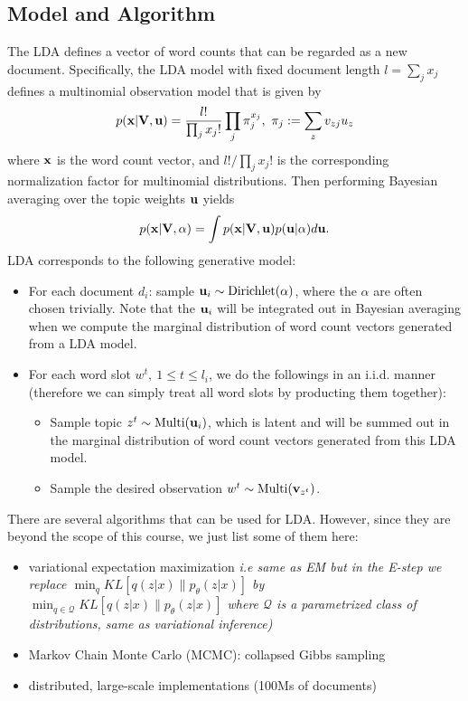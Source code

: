 \documentclass[../book-template.tex]{subfiles}
\begin{document}
\subsection{Model and Algorithm}
The LDA defines a vector of word counts that can be regarded as a new document. Specifically, the LDA model with fixed document length $l=\sum_j x_j$ defines a multinomial observation model that is given by
\begin{equation*}
p({\bf x}|{\bf V, u})=\frac{l!}{\prod_j x_j!}\prod_j \pi_j^{x_j},\ \pi_j := \sum_z v_{zj}u_z
\end{equation*}
where ${\bf x}$ is the word count vector, and $l!/\prod_j x_j!$ is the corresponding normalization factor for multinomial distributions. Then performing Bayesian averaging over the topic weights ${\bf u}$ yields
\begin{equation*}
	p({\bf x}|{\bf V}, \alpha) = \int p({\bf x}|{\bf V, u}) p({\bf u}|\alpha)d{\bf u}.
\end{equation*}
LDA corresponds to the following generative model:
\begin{itemize}
	\item For each document $d_i$: sample ${\bf u}_i\sim \text{Dirichlet}(\alpha)$, where the $\alpha$ are often chosen trivially. Note that the ${\bf u}_i$ will be integrated out in Bayesian averaging when we compute the marginal distribution of word count vectors generated from a LDA model.
	\item For each word slot $w^t,\ 1\leq t\leq l_i$, we do the followings in an i.i.d. manner (therefore we can simply treat all word slots by producting them together):
	\begin{itemize}
		\item Sample topic $z^t \sim \text{Multi}({\bf u}_i)$, which is latent and will be summed out in the marginal distribution of word count vectors generated from this LDA model.
		\item Sample the desired observation $w^t\sim \text{Multi}({\bf v}_{z^t})$.
	\end{itemize}
\end{itemize}
\par There are several algorithms that can be used for LDA. However, since they are beyond the scope of this course, we just list some of them here:
\begin{itemize}
	\item variational expectation maximization \textit{i.e same as EM but in the E-step we replace $\min_q KL[q(z|x) \| p_\theta(z|x)]$ by $\min_{q \in \mathcal{Q}} KL[q(z|x) \| p_\theta(z|x)]$ where $\mathcal{Q}$ is a parametrized class of distributions, same as variational inference)}
	\item Markov Chain Monte Carlo (MCMC): collapsed Gibbs sampling
	\item distributed, large-scale implementations (100Ms of documents)
\end{itemize}
\end{document}
